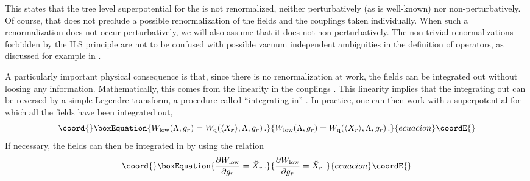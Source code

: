\documentclass[a4paper,12pt]{article}
\def\wl{W_{\rm low}}\def\wu{W_{\rm up}}\def\wq{W_{\rm q}}
\begin{document}
%
This states that the tree level superpotential for the \coordHE{}
is not renormalized, neither perturbatively (as is well-known) nor
non-perturbatively. Of course, that does not preclude a possible 
renormalization of the fields and the couplings taken individually. 
When such a renormalization does not occur perturbatively, we will 
also assume that it does not non-perturbatively.
The non-trivial renormalizations forbidden by the ILS principle are
not to be confused with possible vacuum independent ambiguities in the
definition of operators, as discussed for example in \cite{DH}.

A particularly important physical consequence is that, since there is
no renormalization at work, the fields \coordHE{} can be
integrated out without loosing any information. Mathematically, this
comes from the linearity in the couplings \coordHE{}. This linearity
implies that the integrating out can be reversed by a simple
Legendre transform, a procedure called ``integrating in'' \cite{ken}.
In practice, one can then work with a superpotential for which all the
fields have been integrated out,
%
\begin{equation}\coord{}\boxEquation{
\label{wlowdef}
\wl (\L,g_{r}) = \wq (\langle X_{r}\rangle, \L,g_{r})\, .
}{
\wl (\L,g_{r}) = \wq (\langle X_{r}\rangle, \L,g_{r})\, .
}{ecuacion}\coordE{}\end{equation}
%
If necessary, the fields \coordHE{} can then be integrated in by 
using the relation
%
\begin{equation}\coord{}\boxEquation{
\label{intin}
{\partial\wl\over\partial g_{r}} = \tilde X_{r}\, .
}{
{\partial\wl\over\partial g_{r}} = \tilde X_{r}\, .
}{ecuacion}\coordE{}\end{equation}
%
\end{document}
